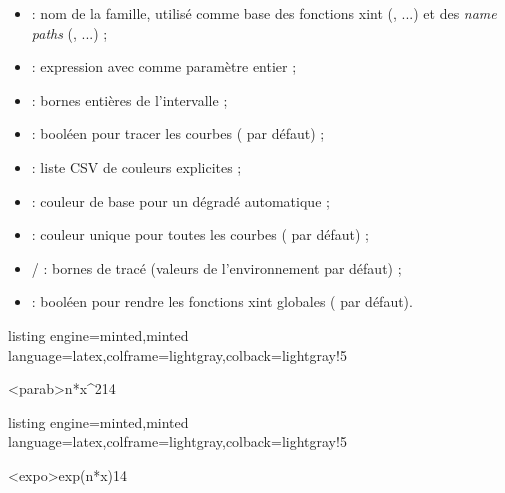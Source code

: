 \documentclass[11pt,a4paper]{ltxdoc}
\begin{document}
\begin{itemize}
  \item {} : nom de la famille, utilisé comme
  base des fonctions \textsf{xint} (,
  ...) et des \emph{name paths}
  (, ...) ;
  \item {} : expression avec 
  comme paramètre entier ;
  \item {} : bornes entières de l'intervalle ;
  \item {} : booléen pour tracer les courbes
  ( par défaut) ;
  \item {} : liste CSV de couleurs explicites ;
  \item {} : couleur de base pour un dégradé
  automatique ;
  \item {} : couleur unique pour toutes les courbes
  ( par défaut) ;
  \item {}/ : bornes de tracé
  (valeurs de l'environnement par défaut) ;
  \item {} : booléen pour rendre les fonctions
  \textsf{xint} globales ( par défaut).
\end{itemize}

\begin{tcblisting}{listing engine=minted,minted language=latex,colframe=lightgray,colback=lightgray!5}
\begin{GraphiqueTikz}[x=1.5cm,y=0.75cm,Xmin=-3,Xmax=3,Ymin=-1,Ymax=10]
  \DefinirFamilleCourbes%
    [Trace,Couleurs={blue,red,green,orange}]%
    <parab>{n*x^2}{1}{4}
\end{GraphiqueTikz}
\end{tcblisting}

\begin{tcblisting}{listing engine=minted,minted language=latex,colframe=lightgray,colback=lightgray!5}
\begin{GraphiqueTikz}[x=1.5cm,y=0.5cm,Xmin=-2,Xmax=3,Ymin=-1,Ymax=8]
  \DefinirFamilleCourbes%
    [Trace,CouleurBase=red,RestreindreY]%
    <expo>{exp(n*x)}{1}{4}
\end{GraphiqueTikz}
\end{tcblisting}
\end{document}
